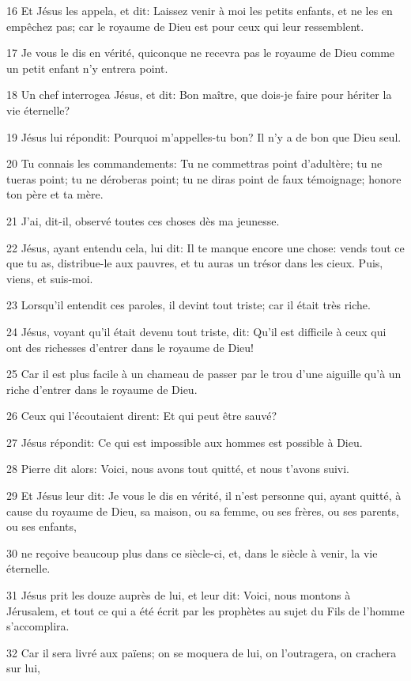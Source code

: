 \par 16 Et Jésus les appela, et dit: Laissez venir à moi les petits enfants, et ne les en empêchez pas; car le royaume de Dieu est pour ceux qui leur ressemblent.
\par 17 Je vous le dis en vérité, quiconque ne recevra pas le royaume de Dieu comme un petit enfant n'y entrera point.
\par 18 Un chef interrogea Jésus, et dit: Bon maître, que dois-je faire pour hériter la vie éternelle?
\par 19 Jésus lui répondit: Pourquoi m'appelles-tu bon? Il n'y a de bon que Dieu seul.
\par 20 Tu connais les commandements: Tu ne commettras point d'adultère; tu ne tueras point; tu ne déroberas point; tu ne diras point de faux témoignage; honore ton père et ta mère.
\par 21 J'ai, dit-il, observé toutes ces choses dès ma jeunesse.
\par 22 Jésus, ayant entendu cela, lui dit: Il te manque encore une chose: vends tout ce que tu as, distribue-le aux pauvres, et tu auras un trésor dans les cieux. Puis, viens, et suis-moi.
\par 23 Lorsqu'il entendit ces paroles, il devint tout triste; car il était très riche.
\par 24 Jésus, voyant qu'il était devenu tout triste, dit: Qu'il est difficile à ceux qui ont des richesses d'entrer dans le royaume de Dieu!
\par 25 Car il est plus facile à un chameau de passer par le trou d'une aiguille qu'à un riche d'entrer dans le royaume de Dieu.
\par 26 Ceux qui l'écoutaient dirent: Et qui peut être sauvé?
\par 27 Jésus répondit: Ce qui est impossible aux hommes est possible à Dieu.
\par 28 Pierre dit alors: Voici, nous avons tout quitté, et nous t'avons suivi.
\par 29 Et Jésus leur dit: Je vous le dis en vérité, il n'est personne qui, ayant quitté, à cause du royaume de Dieu, sa maison, ou sa femme, ou ses frères, ou ses parents, ou ses enfants,
\par 30 ne reçoive beaucoup plus dans ce siècle-ci, et, dans le siècle à venir, la vie éternelle.
\par 31 Jésus prit les douze auprès de lui, et leur dit: Voici, nous montons à Jérusalem, et tout ce qui a été écrit par les prophètes au sujet du Fils de l'homme s'accomplira.
\par 32 Car il sera livré aux païens; on se moquera de lui, on l'outragera, on crachera sur lui,
